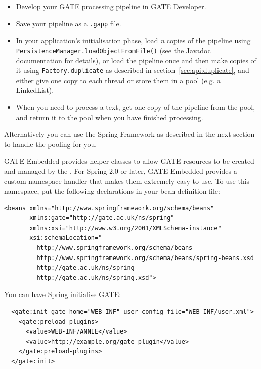 \begin{itemize}
\item Develop your GATE processing pipeline in GATE Developer.
\item Save your pipeline as a \texttt{.gapp} file.
\item In your application's initialisation phase, load {\em n} copies of the
pipeline using \texttt{PersistenceManager.loadObjectFromFile()} (see the
Javadoc documentation for details), or load the pipeline once and then make
copies of it using \texttt{Factory.duplicate} as described in
section~\ref{sec:api:duplicate}, and either give one copy to each thread or
store them in a pool (e.g. a LinkedList).
\item When you need to process a text, get one copy of the pipeline from the
pool, and return it to the pool when you have finished processing.
\end{itemize}

Alternatively you can use the Spring Framework as described in the next section
to handle the pooling for you.


GATE Embedded provides helper classes to allow GATE resources to be created and managed
by the .  For Spring
2.0 or later, GATE Embedded provides a custom namespace handler that makes them
extremely easy to use.  To use this namespace, put the following declarations
in your bean definition file:
\begin{small}\begin{verbatim}
<beans xmlns="http://www.springframework.org/schema/beans"
       xmlns:gate="http://gate.ac.uk/ns/spring"
       xmlns:xsi="http://www.w3.org/2001/XMLSchema-instance"
       xsi:schemaLocation="
         http://www.springframework.org/schema/beans
         http://www.springframework.org/schema/beans/spring-beans.xsd
         http://gate.ac.uk/ns/spring
         http://gate.ac.uk/ns/spring.xsd">
\end{verbatim}\end{small}

You can have Spring initialise GATE:
\begin{small}\begin{verbatim}
  <gate:init gate-home="WEB-INF" user-config-file="WEB-INF/user.xml">
    <gate:preload-plugins>
      <value>WEB-INF/ANNIE</value>
      <value>http://example.org/gate-plugin</value>
    </gate:preload-plugins>
  </gate:init>
\end{verbatim}\end{small}

